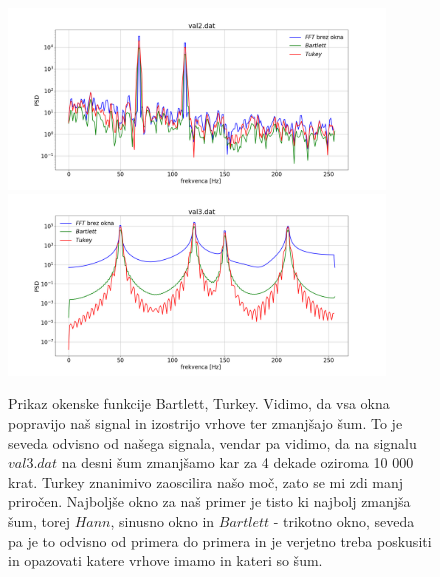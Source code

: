 \documentclass[11pt, a4paper]{article}
\begin{document}
\begin{figure}[H]

\hspace{-2cm}
\includegraphics[width=10cm]{prva_tretji2.png}
\includegraphics[width=10cm]{prva_tretji2b.png}

\caption{Prikaz okenske funkcije Bartlett, Turkey. 
Vidimo, da vsa okna popravijo naš signal in izostrijo vrhove ter zmanjšajo šum. To je seveda odvisno od našega signala, vendar pa vidimo, da na signalu $val3.dat$ na desni šum  zmanjšamo kar za 4 dekade oziroma 10 000 krat. Turkey znanimivo zaoscilira našo moč, zato se mi zdi manj priročen. Najboljše okno za naš primer je tisto ki najbolj zmanjša šum, torej $Hann$, sinusno okno in $Bartlett$ - trikotno okno, seveda pa je to odvisno od primera do primera in je verjetno treba poskusiti in opazovati katere vrhove imamo in kateri so šum.}  
\end{figure}
\end{document}
